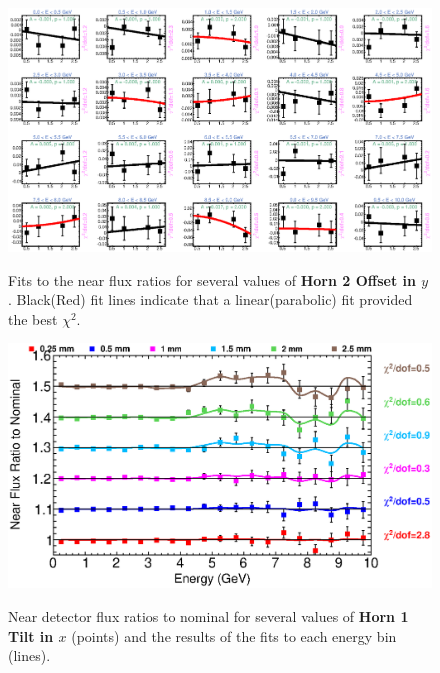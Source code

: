 \begin{figure}[ht]
  \begin{center}
    {\includegraphics[width=5.0in]{figures/Horn2YOffset_near_fits.eps}}
  \end{center}
\caption{ Fits to the near flux ratios for several values of {\bf Horn 2 Offset in $y$}. Black(Red) fit lines indicate that a linear(parabolic) fit provided the best $\chi^2$. }
\end{figure}

\begin{figure}[ht]
  \begin{center}
    {\includegraphics[width=6.0in]{figures/Horn1XTilt_near_summary.eps}}
  \end{center}
\caption{ Near detector flux ratios to nominal for several values of {\bf Horn 1 Tilt in $x$} (points) and the results of the fits to each energy bin (lines).}
\end{figure}

